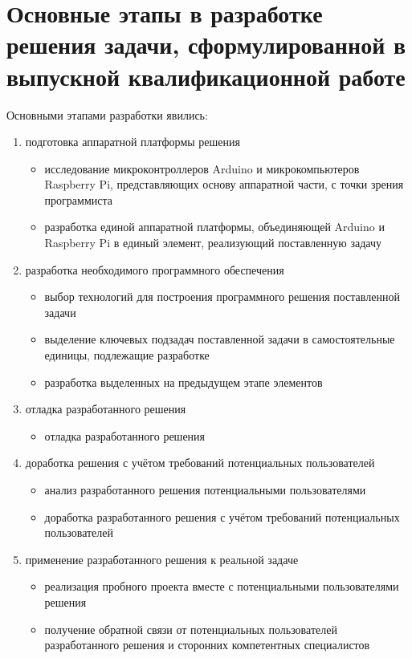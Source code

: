 \section{Основные этапы в разработке решения задачи, сформулированной в выпускной квалификационной работе}
Основными этапами разработки явились:
\begin{enumerate}
\item подготовка аппаратной платформы решения 
\begin{itemize}
    \item исследование микроконтроллеров Arduino и микрокомпьютеров Raspberry Pi, представляющих основу аппаратной части, с точки зрения программиста
    \item разработка единой аппаратной платформы, объединяющей Arduino и Raspberry Pi в единый элемент, реализующий поставленную задачу
\end{itemize}

\item разработка необходимого программного обеспечения
\begin{itemize}
    \item выбор технологий для построения программного решения поставленной задачи
    \item выделение ключевых подзадач поставленной задачи в самостоятельные единицы, подлежащие разработке
    \item разработка выделенных на предыдущем этапе элементов
\end{itemize}

\item отладка разработанного решения
\begin{itemize}
    \item отладка разработанного решения
\end{itemize}

\item доработка решения с учётом требований потенциальных пользователей
\begin{itemize}
    \item анализ разработанного решения потенциальными пользователями
    \item доработка разработанного решения с учётом требований потенциальных пользователей
\end{itemize}

\item применение разработанного решения к реальной задаче  
\begin{itemize}
    \item реализация пробного проекта вместе с потенциальными пользователями решения
    \item получение обратной связи от потенциальных пользователей разработанного решения и сторонних компетентных специалистов
\end{itemize}


\end{enumerate}
